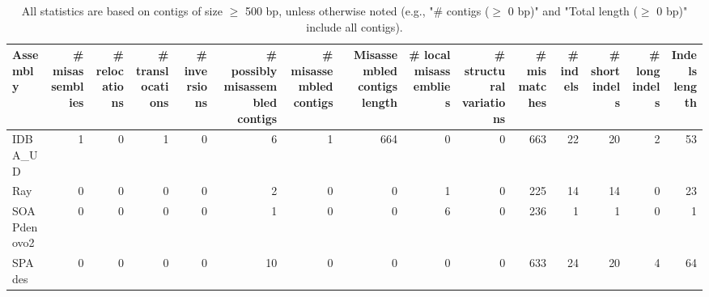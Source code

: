 \documentclass[12pt,a4paper]{article}
\begin{document}
\begin{table}[ht]
\begin{center}
\caption{All statistics are based on contigs of size $\geq$ 500 bp, unless otherwise noted (e.g., "\# contigs ($\geq$ 0 bp)" and "Total length ($\geq$ 0 bp)" include all contigs).}
\begin{tabular}{|l*{14}{|r}|}
\hline
Assembly & \# misassemblies &     \# relocations &     \# translocations &     \# inversions & \# possibly misassembled contigs & \# misassembled contigs & Misassembled contigs length & \# local misassemblies & \# structural variations & \# mismatches & \# indels &     \# short indels &     \# long indels & Indels length \\ \hline
IDBA\_UD & 1 & 0 & 1 & 0 & 6 & 1 & 664 & 0 & 0 & 663 & 22 & 20 & 2 & 53 \\ \hline
Ray & 0 & 0 & 0 & 0 & 2 & 0 & 0 & 1 & 0 & 225 & 14 & 14 & 0 & 23 \\ \hline
SOAPdenovo2 & 0 & 0 & 0 & 0 & 1 & 0 & 0 & 6 & 0 & 236 & 1 & 1 & 0 & 1 \\ \hline
SPAdes & 0 & 0 & 0 & 0 & 10 & 0 & 0 & 0 & 0 & 633 & 24 & 20 & 4 & 64 \\ \hline
\end{tabular}
\end{center}
\end{table}
\end{document}
